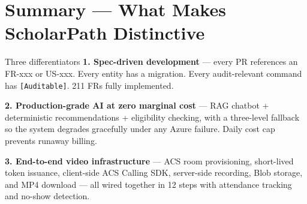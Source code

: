 \documentclass[11pt,a4paper]{article}
\begin{document}
\section{Summary --- What Makes ScholarPath Distinctive}

\begin{keybox}{Three differentiators}
\textbf{1. Spec-driven development} --- every PR references an FR-xxx or US-xxx.
Every entity has a migration. Every audit-relevant command has
\texttt{[Auditable]}. 211 FRs fully implemented.

\medskip
\textbf{2. Production-grade AI at zero marginal cost} --- RAG chatbot + deterministic
recommendations + eligibility checking, with a three-level fallback so the system
degrades gracefully under any Azure failure. Daily cost cap prevents runaway billing.

\medskip
\textbf{3. End-to-end video infrastructure} --- ACS room provisioning, short-lived token
issuance, client-side ACS Calling SDK, server-side recording, Blob storage, and MP4
download --- all wired together in 12 steps with attendance tracking and no-show detection.
\end{keybox}
\end{document}
